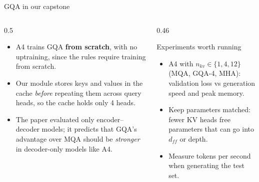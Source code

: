 \documentclass[aspectratio=169,11pt]{beamer}
\begin{document}
\begin{frame}{GQA in our capstone}
  \begin{columns}[T]
    \begin{column}{0.5\textwidth}
      \small
      \begin{itemize}
        \item A4 trains GQA \textbf{from scratch}, with no uptraining, since the rules require training from scratch.
        \item Our  module stores keys and values in the cache \emph{before} repeating them across query heads, so the cache holds only 4 heads.
        \item The paper evaluated only encoder--decoder models; it predicts that GQA's advantage over MQA should be \emph{stronger} in decoder-only models like A4.
      \end{itemize}
    \end{column}
    \begin{column}{0.46\textwidth}
      \begin{block}{Experiments worth running}
        \small
        \begin{itemize}
          \item A4 with $n_{kv}\in\{1,4,12\}$ (MQA, GQA-4, MHA): validation loss vs generation speed and peak memory.
          \item Keep parameters matched: fewer KV heads free parameters that can go into $d_{ff}$ or depth.
          \item Measure tokens per second when generating the test set.
        \end{itemize}
      \end{block}
    \end{column}
  \end{columns}
\end{frame}
\end{document}
